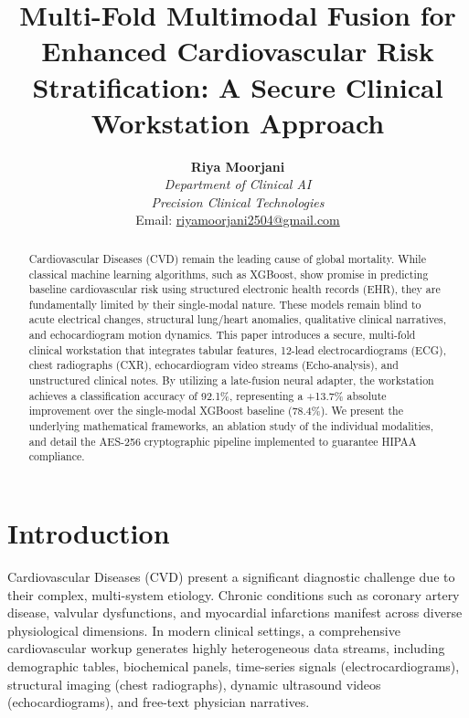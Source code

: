 \documentclass[11pt,onecolumn]{article}
\begin{document}
\title{\Large \textbf{Multi-Fold Multimodal Fusion for Enhanced Cardiovascular Risk Stratification: A Secure Clinical Workstation Approach}}

\author{
  \textbf{Riya Moorjani} \\
  \textit{Department of Clinical AI} \\
  \textit{Precision Clinical Technologies} \\
  Email: \href{mailto:riyamoorjani2504@gmail.com}{riyamoorjani2504@gmail.com}
}
\date{}
\maketitle

\begin{abstract}
Cardiovascular Diseases (CVD) remain the leading cause of global mortality. While classical machine learning algorithms, such as XGBoost, show promise in predicting baseline cardiovascular risk using structured electronic health records (EHR), they are fundamentally limited by their single-modal nature. These models remain blind to acute electrical changes, structural lung/heart anomalies, qualitative clinical narratives, and echocardiogram motion dynamics. This paper introduces a secure, multi-fold clinical workstation that integrates tabular features, 12-lead electrocardiograms (ECG), chest radiographs (CXR), echocardiogram video streams (Echo-analysis), and unstructured clinical notes. By utilizing a late-fusion neural adapter, the workstation achieves a classification accuracy of 92.1\%, representing a +13.7\% absolute improvement over the single-modal XGBoost baseline (78.4\%). We present the underlying mathematical frameworks, an ablation study of the individual modalities, and detail the AES-256 cryptographic pipeline implemented to guarantee HIPAA compliance.
\end{abstract}

\vspace{0.2in}

\section{Introduction}
Cardiovascular Diseases (CVD) present a significant diagnostic challenge due to their complex, multi-system etiology. Chronic conditions such as coronary artery disease, valvular dysfunctions, and myocardial infarctions manifest across diverse physiological dimensions. In modern clinical settings, a comprehensive cardiovascular workup generates highly heterogeneous data streams, including demographic tables, biochemical panels, time-series signals (electrocardiograms), structural imaging (chest radiographs), dynamic ultrasound videos (echocardiograms), and free-text physician narratives.
\end{document}
